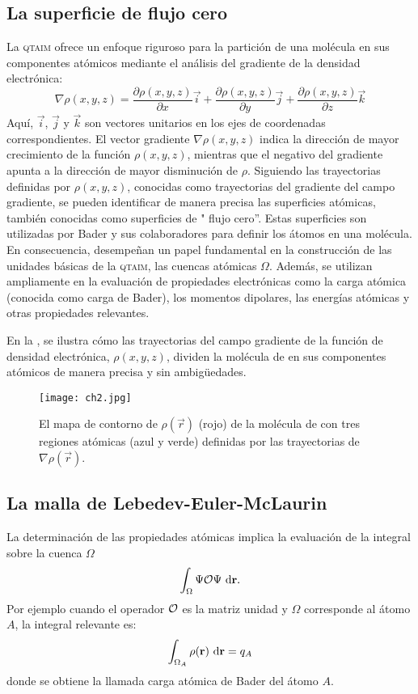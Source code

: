 	\subsection{La superficie de flujo cero}
	La \textsc{qtaim} ofrece un enfoque riguroso para la partición de una molécula en sus componentes atómicos 
	mediante el análisis del gradiente de la densidad electrónica:
	\begin{equation}
		\nabla \rho(x,y,z) = \frac{\partial \rho(x,y,z)}{\partial x} \vec{i} +
		\frac{\partial \rho(x,y,z)}{\partial y} \vec{j} +
		\frac{\partial \rho(x,y,z)}{\partial z} \vec{k}
	\end{equation}
	Aquí, $\vec{i}$, $\vec{j}$ y $\vec{k}$ son vectores unitarios en los ejes de coordenadas correspondientes. 
	El vector gradiente $\nabla \rho(x,y,z)$ indica la dirección de mayor crecimiento de la función $\rho(x,y,z)$, mientras que el 
	negativo del gradiente apunta a la dirección de mayor disminución de $\rho$. Siguiendo las trayectorias definidas por $\rho(x,y,z)$, 
	conocidas como trayectorias del gradiente del campo gradiente, se pueden identificar de manera precisa las superficies atómicas, 
	también conocidas como superficies de " flujo cero''. Estas superficies son utilizadas por Bader y sus colaboradores para definir los átomos 
	en una molécula. En consecuencia, desempeñan un papel fundamental en la construcción de las unidades básicas de la 
	\textsc{qtaim}, las cuencas atómicas $\Omega$. Además, se utilizan ampliamente en la evaluación de propiedades electrónicas como la
	 carga atómica (conocida como carga de Bader), los momentos dipolares, las energías atómicas y otras propiedades relevantes.
	
	En la  , se ilustra cómo las trayectorias del campo gradiente de la función de densidad electrónica, $\rho(x,y,z)$, 
	dividen la molécula de  en sus componentes atómicos de manera precisa y sin ambigüedades.
	\begin{figure}[!ht] 
		\centering
		\texttt{[image: ch2.jpg]}
	\caption{El mapa de contorno de $\rho(\vec{r})$ (rojo) de la molécula 
	de  con tres regiones atómicas (azul y verde) definidas por las 
	trayectorias de $\nabla\rho(\vec{r})$.}
	\label{fig:ch2fig}
	\end{figure}	
	
	\subsection{La malla de Lebedev-Euler-McLaurin}
	La determinación de las propiedades atómicas implica la evaluación de la integral
	sobre la cuenca $\Omega$ 
	\begin{equation*}
		\int_\Omega\Psi{\cal O}\Psi\ \df{d}\vec{r}.
	\end{equation*}	
	Por ejemplo cuando el operador $\cal O$ es la matriz unidad y $\Omega$ 
	corresponde al átomo $A$, la integral relevante es:
	\begin{equation*}
		\int_{\Omega_A}\rho(\vec{r})\ \df{d}\vec{r} = q_A
	\end{equation*}
	donde se obtiene la llamada carga atómica de Bader del átomo $A$. 

